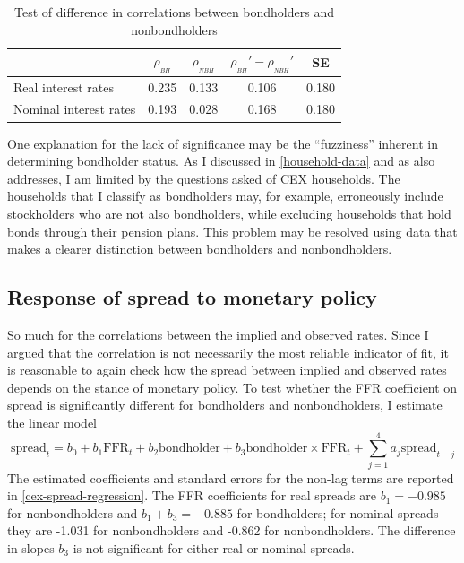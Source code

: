 \begin{table}[t]
\centering
\caption{Test of difference in correlations between bondholders and nonbondholders}
\label{cex-correlation-test}
\begin{tabular}{lcccc} \hline
& $\rho_{_{BH}}$ & $\rho_{_{NBH}}$ & $\rho_{_{BH}}' - \rho_{_{NBH}}'$ & SE \\ \hline
Real interest rates    & 0.235 & 0.133 & 0.106 & 0.180 \\
Nominal interest rates & 0.193 & 0.028 & 0.168 & 0.180 \\ \hline
\end{tabular}
\end{table}

One explanation for the lack of significance may be the ``fuzziness'' inherent in determining bondholder status. As I discussed in \autoref{household-data} and as \cite{vissing02} also addresses, I am limited by the questions asked of CEX households. The households that I classify as bondholders may, for example, erroneously include stockholders who are not also bondholders, while excluding households that hold bonds through their pension plans. This problem may be resolved using data that makes a clearer distinction between bondholders and nonbondholders.



\subsection{Response of spread to monetary policy}
So much for the correlations between the implied and observed rates. Since I argued that the correlation is not necessarily the most reliable indicator of fit, it is reasonable to again check how the spread between implied and observed rates depends on the stance of monetary policy. To test whether the FFR coefficient on spread is significantly different for bondholders and nonbondholders, I estimate the linear model
\begin{equation}
\label{spread-ffr-bondholder-regression}
\mathrm{spread}_t = b_0 + b_1 \mathrm{FFR}_t + b_2 \mathrm{bondholder} + b_3 \mathrm{bondholder} \times \mathrm{FFR}_t + \sum_{j=1}^4 a_j \mathrm{spread}_{t-j}
\end{equation}
The estimated coefficients and standard errors for the non-lag terms are reported in \autoref{cex-spread-regression}. The FFR coefficients for real spreads are $b_1 = -0.985$ for nonbondholders and $b_1 + b_3 = -0.885$ for bondholders; for nominal spreads they are -1.031 for nonbondholders and -0.862 for nonbondholders. The difference in slopes $b_3$ is not significant for either real or nominal spreads.

